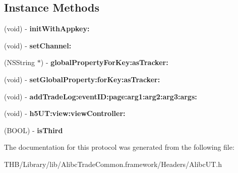 \subsection*{Instance Methods}
\begin{DoxyCompactItemize}
\item 
\mbox{\label{protocol_alibc_u_t_adapter_01-p_a34ad6ca5d8070628e966a0e802ce4385}} 
(void) -\/ {\bfseries init\+With\+Appkey\+:}
\item 
\mbox{\label{protocol_alibc_u_t_adapter_01-p_a02885bba644e2e9d2509794e949fccd3}} 
(void) -\/ {\bfseries set\+Channel\+:}
\item 
\mbox{\label{protocol_alibc_u_t_adapter_01-p_a6beef47cdf5e69befb41e65ee83b7dd3}} 
(N\+S\+String $\ast$) -\/ {\bfseries global\+Property\+For\+Key\+:as\+Tracker\+:}
\item 
\mbox{\label{protocol_alibc_u_t_adapter_01-p_a7c7a31958f859daf8c9d5206dcd7ad92}} 
(void) -\/ {\bfseries set\+Global\+Property\+:for\+Key\+:as\+Tracker\+:}
\item 
\mbox{\label{protocol_alibc_u_t_adapter_01-p_a49167b8690dac75d99d57a90b0786af0}} 
(void) -\/ {\bfseries add\+Trade\+Log\+:event\+I\+D\+:page\+:arg1\+:arg2\+:arg3\+:args\+:}
\item 
\mbox{\label{protocol_alibc_u_t_adapter_01-p_ab0de552b0332675f5e15ad50f594215e}} 
(void) -\/ {\bfseries h5\+U\+T\+:view\+:view\+Controller\+:}
\item 
\mbox{\label{protocol_alibc_u_t_adapter_01-p_a1fc134aa29cde496ee7616d8f8927d9a}} 
(B\+O\+OL) -\/ {\bfseries is\+Third}
\end{DoxyCompactItemize}


The documentation for this protocol was generated from the following file\+:\begin{DoxyCompactItemize}
\item 
T\+H\+B/\+Library/lib/\+Alibc\+Trade\+Common.\+framework/\+Headers/Alibc\+U\+T.\+h\end{DoxyCompactItemize}
